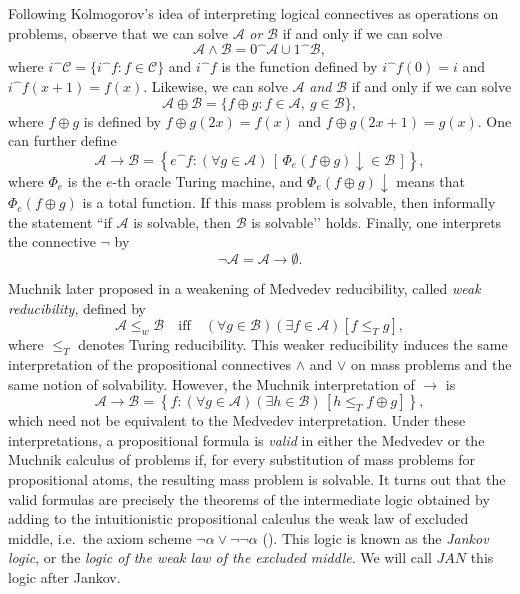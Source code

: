 \documentclass[11pt]{amsart}
\newcommand{\cat}[2]{#1\widehat{\phantom{\alpha}}\!#2}
\newcommand{\MP}[1]{\ensuremath{\mathcal{#1}}}
\begin{document}
Following Kolmogorov’s idea of interpreting logical connectives as operations 
on problems, observe that we can solve $\MP{A}$ \emph{or} $\MP{B}$ if and 
only if we can solve 
\[
  \MP{A} \wedge \MP{B}
    = \cat{0}{\MP{A}} \cup \cat{1}{\MP{B}},
\]
where $\cat{i}{\MP{C}} = \{ \cat{i}{f} : f \in \MP{C} \}$ and $\cat{i}{f}$ is 
the function defined by $\cat{i}{f}(0) = i$ and $\cat{i}{f}(x+1) = f(x)$. 
Likewise, we can solve $\MP{A}$ \emph{and} $\MP{B}$ if and only if we can 
solve 
\[
  \MP{A} \oplus \MP{B} = \{ f \oplus g : f \in \MP{A},\ g \in \MP{B} \},
\]
where $f \oplus g$ is defined by $f \oplus g(2x) = f(x)$ and $f \oplus 
g(2x+1) = g(x)$. One can further define 
\[
  \MP{A} \to \MP{B}
    = \left\{ \cat{e}{f} : (\forall g \in \MP{A})\,
        [\, \Phi_e(f \oplus g) \downarrow \in \MP{B} \,] \right\},
\]
where $\Phi_e$ is the $e$-th oracle Turing machine, and $\Phi_e(f \oplus g) 
\downarrow$ means that $\Phi_e(f \oplus g)$ is a total function. If this mass 
problem is solvable, then informally the statement “if $\MP{A}$ is solvable, 
then $\MP{B}$ is solvable’’ holds. Finally, one interprets the connective 
$\neg$ by 
\[
  \neg \MP{A} = \MP{A} \to \emptyset .
\]

Muchnik later proposed in \cite{Muchnik:Lattice} a weakening of Medvedev 
reducibility, called \emph{weak reducibility}, defined by 
\[
  \MP{A} \leq_w \MP{B}
    \quad\text{iff}\quad
  (\forall g \in \MP{B})(\exists f \in \MP{A})[ f \leq_T g ],
\]
where $\leq_T$ denotes Turing reducibility. This weaker reducibility induces 
the same interpretation of the propositional connectives $\land$ and $\lor$ 
on mass problems and the same notion of solvability. However, the Muchnik 
interpretation of $\to$ is 
\[
\MP{A} \to \MP{B} = \left\{f : (\forall g \in \MP{A})(\exists h 
\in \MP{B})\, [h \leq_T f \oplus g] \right\},
\]
which need not be equivalent to the Medvedev interpretation. Under these 
interpretations, a propositional formula is \emph{valid} in either the 
Medvedev or the Muchnik calculus of problems if, for every substitution of 
mass problems for propositional atoms, the resulting mass problem is 
solvable. It turns out that the valid formulas are precisely the theorems of 
the intermediate logic obtained by adding to the intuitionistic propositional 
calculus the weak law of excluded middle, i.e.\ the axiom scheme $\neg \alpha 
\lor \neg\neg \alpha$ (\cite{Medvedev, Sorbi:Embedding}). This logic is known 
as the \emph{Jankov logic}, or the \emph{logic of the weak law of the 
excluded middle}. We will call $JAN$ this logic after Jankov. 
\end{document}
